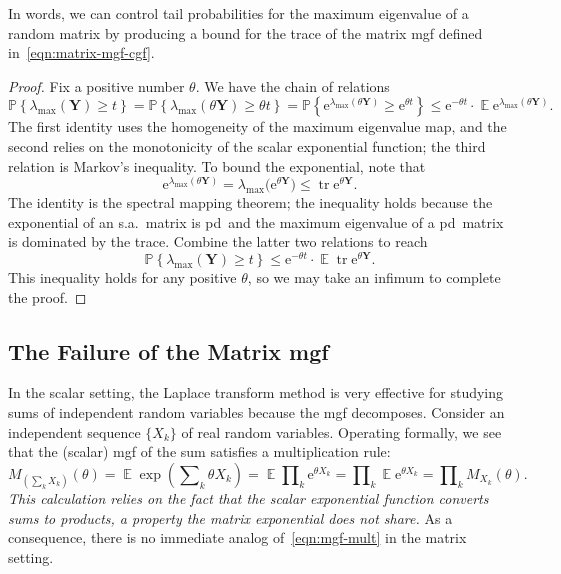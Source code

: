 \documentclass[11pt,letterpaper,twoside,reqno,draft]{amsart}
\theoremstyle{remark}
\numberwithin{equation}{section}
\numberwithin{thm}{section}
\begin{document}
In words, we can control tail probabilities for the maximum eigenvalue of a random matrix by producing a bound for the trace of the matrix mgf defined in~\eqref{eqn:matrix-mgf-cgf}.  

\begin{proof}
Fix a positive number $\theta$.  We have the chain of relations
$$
{\mathbb{P}\left\{ {{ \lambda_{\max}({\bm{{Y}}}) \geq t }} \right\}}
	= {\mathbb{P}\left\{ {{ \lambda_{\max}(\theta {\bm{{Y}}}) \geq \theta t }} \right\}}
	= {\mathbb{P}\left\{ {{ {\mathrm{e}}^{\lambda_{\max}(\theta {\bm{{Y}}})} \geq {\mathrm{e}}^{\theta t} }} \right\}}
	\leq {\mathrm{e}}^{- \theta t} \cdot {\operatorname{\mathbb{E}}} {\mathrm{e}}^{\lambda_{\max}(\theta{\bm{{Y}}})}.
$$
The first identity uses the homogeneity of the maximum eigenvalue map, and the second relies on the monotonicity of the scalar exponential function; the third relation is Markov's inequality.  To bound the exponential, note that
$$
{\mathrm{e}}^{\lambda_{\max}(\theta {\bm{{Y}}})}
	= \lambda_{\max}\bigl({\mathrm{e}}^{\theta{\bm{{Y}}}}\bigr)
	\leq {\operatorname{tr}} {\mathrm{e}}^{\theta{\bm{{Y}}}}.
$$
The identity is the spectral mapping theorem; the inequality holds because the exponential of an s.a.~matrix is pd~and the maximum eigenvalue of a pd~matrix is dominated by the trace.  Combine the latter two relations to reach
$$
{\mathbb{P}\left\{ {{ \lambda_{\max}({\bm{{Y}}}) \geq t }} \right\}}
	\leq {\mathrm{e}}^{- \theta t} \cdot {\operatorname{\mathbb{E}}} {\operatorname{tr}} {\mathrm{e}}^{\theta{\bm{{Y}}}}.
$$
This inequality holds for any positive $\theta$, so we may take an infimum to complete the proof.
\end{proof}

\subsection{The Failure of the Matrix mgf} \label{sec:mom-fail}

In the scalar setting, the Laplace transform method is very effective for studying sums of independent random variables because the mgf decomposes.
Consider an independent sequence $\{X_k\}$ of real random variables.  Operating formally, we see that the (scalar) mgf of the sum satisfies a multiplication rule:
\begin{equation} \label{eqn:mgf-mult}
M_{(\sum\nolimits_k X_k)}(\theta)
	= {\operatorname{\mathbb{E}}} \exp\left(\sum\nolimits_k \theta X_k \right)
	= {\operatorname{\mathbb{E}}} \prod\nolimits_k {\mathrm{e}}^{\theta X_k}
	= \prod\nolimits_k {\operatorname{\mathbb{E}}} {\mathrm{e}}^{\theta X_k}
	= \prod\nolimits_k M_{X_k}(\theta).
\end{equation}
{\em This calculation relies on the fact that the scalar exponential function converts sums to products, a property the matrix exponential does not share.}  As a consequence, there is no immediate analog of~\eqref{eqn:mgf-mult} in the matrix setting.  
\end{document}
